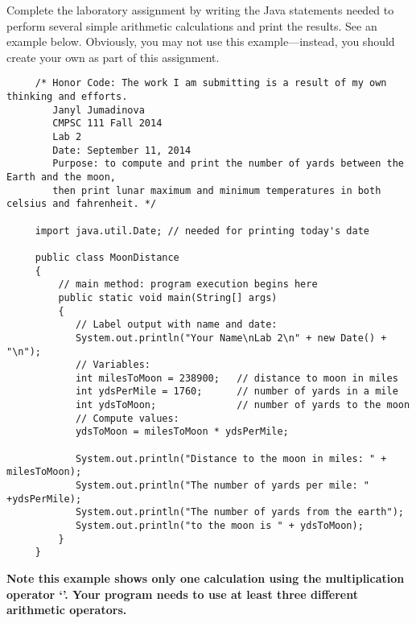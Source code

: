  Complete the laboratory assignment by writing the Java statements needed to perform several simple arithmetic
 calculations and print the results. See an example below. Obviously, you may not use this example---instead, you should
 create your own as part of this assignment.

\begin{verbatim}
     /* Honor Code: The work I am submitting is a result of my own thinking and efforts.
        Janyl Jumadinova
        CMPSC 111 Fall 2014
        Lab 2
        Date: September 11, 2014
        Purpose: to compute and print the number of yards between the Earth and the moon, 
        then print lunar maximum and minimum temperatures in both celsius and fahrenheit. */
 
     import java.util.Date; // needed for printing today's date
     
     public class MoonDistance
     {
         // main method: program execution begins here
         public static void main(String[] args)
         {
            // Label output with name and date:
            System.out.println("Your Name\nLab 2\n" + new Date() + "\n");     
            // Variables:
            int milesToMoon = 238900;   // distance to moon in miles
            int ydsPerMile = 1760;      // number of yards in a mile
            int ydsToMoon;              // number of yards to the moon           
            // Compute values:
            ydsToMoon = milesToMoon * ydsPerMile;
            
            System.out.println("Distance to the moon in miles: " + milesToMoon);
            System.out.println("The number of yards per mile: " +ydsPerMile);
            System.out.println("The number of yards from the earth");
            System.out.println("to the moon is " + ydsToMoon);
         }
     }
\end{verbatim}

\noindent \textbf{Note this example shows only one calculation using the multiplication operator `{\tt *}'. Your program
needs to use at least three different arithmetic operators. }

